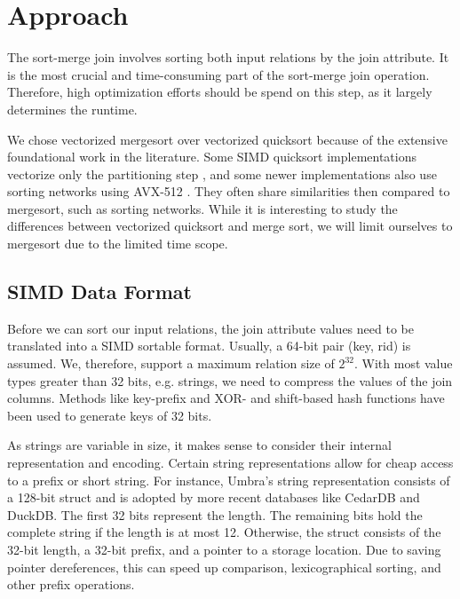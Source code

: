 \section{Approach}
\label{sec:approach}


The sort-merge join involves sorting both input relations by the join attribute. It is the most crucial and 
time-consuming part of the sort-merge join operation. Therefore, high optimization efforts should
be spend on this step, as it largely determines the runtime. 

We chose vectorized mergesort over vectorized quicksort because of the extensive foundational work in 
the literature. Some SIMD quicksort implementations vectorize only the partitioning step \cite{DBLP:journals/cj/GueronK16},
and some newer implementations also use sorting networks using AVX-512 \cite{Bramas}. They often share
similarities then compared to mergesort, such as sorting networks. While it is interesting
to study the differences between vectorized quicksort and merge sort, we will limit ourselves to
mergesort due to the limited time scope.

\subsection{SIMD Data Format}
Before we can sort our input relations, the join attribute values need to be translated into a SIMD sortable
format. Usually, a 64-bit pair (key, rid) is assumed. We, therefore,
support a maximum relation size of $2^{32}$. With most value types greater
than 32 bits, e.g. strings, we need to compress the values of the join columns. Methods like 
key-prefix \cite{chris_nyberg__1994} and XOR- and shift-based hash functions \cite{1319989} have 
been used to generate keys of 32 bits.

As strings are variable in size, it makes sense to consider their internal representation and
encoding. Certain string representations allow for cheap access to a prefix or short string.
For instance, Umbra's string representation \cite{DBLP:conf/cidr/NeumannF20} consists of a 128-bit 
struct and is adopted by more recent databases like CedarDB and DuckDB. The first 32 bits represent 
the length. The remaining bits hold
the complete string if the length is at most 12. Otherwise, the struct consists of the 32-bit
length, a 32-bit prefix, and a pointer to a storage location. Due to saving pointer dereferences,
this can speed up comparison, lexicographical sorting, and other prefix operations.



